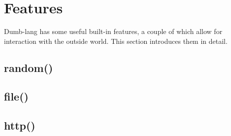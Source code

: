 \documentclass[12pt,a4paper]{article}
\begin{document}
\section{Features}
Dumb-lang has some useful built-in features, a couple of which allow for interaction with the outside world. This section introduces them in detail.

\subsection{random()}

\subsection{file()}


\subsection{http()}
\end{document}
